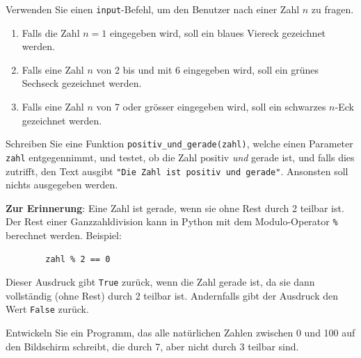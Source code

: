 \begin{myexercise}
	Verwenden Sie einen \lstinline|input|-Befehl, um den Benutzer nach einer Zahl $n$ zu fragen.
	\begin{enumerate}
		\item Falls die Zahl $n = 1$ eingegeben wird, soll ein blaues Viereck gezeichnet werden.
		\item Falls eine Zahl $n$ von 2 bis und mit 6 eingegeben wird, soll ein grünes Sechseck gezeichnet werden.
		\item Falls eine Zahl $n$ von 7 oder grösser eingegeben wird, soll ein schwarzes $n$-Eck gezeichnet werden.
	\end{enumerate}
	\begin{myanswer}
		
	\end{myanswer}
\end{myexercise}

\begin{myexercise}\label{ex:posUndGerade}
	Schreiben Sie eine Funktion \lstinline|positiv_und_gerade(zahl)|, welche einen Parameter \lstinline|zahl| entgegennimmt, und testet, ob die Zahl positiv \textit{und} gerade ist, und falls dies zutrifft, den Text ausgibt \lstinline|"Die Zahl ist positiv und gerade"|. Ansonsten soll nichts ausgegeben werden.

	\textbf{Zur Erinnerung}: Eine Zahl ist gerade, wenn sie ohne Rest durch 2 teilbar ist. Der Rest einer Ganzzahldivision kann in Python mit dem Modulo-Operator \lstinline|%| berechnet werden. Beispiel:
	\begin{lstlisting}
		zahl % 2 == 0
	\end{lstlisting}
	Dieser Ausdruck gibt \lstinline|True| zurück, wenn die Zahl gerade ist, da sie dann vollständig (ohne Rest) durch 2 teilbar ist. Andernfalls gibt der Ausdruck den Wert \lstinline|False| zurück.


	\begin{myanswer}
		
	\end{myanswer}
\end{myexercise}

\begin{myexercise}
	Entwickeln Sie ein Programm, das alle natürlichen Zahlen zwischen 0 und 100 auf den Bildschirm schreibt, die durch 7, aber nicht durch 3 teilbar sind.
	\begin{myanswer}
		
	\end{myanswer}
\end{myexercise}

